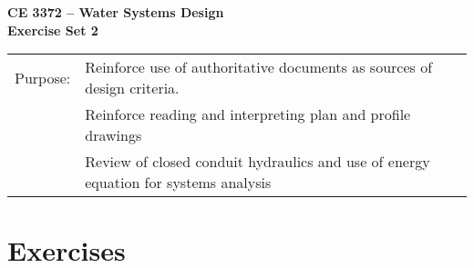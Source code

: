 \documentclass[12pt]{article}
\begin{document}
\begin{center}
{\textbf{{ CE 3372 -- Water Systems Design} \\ {Exercise Set 2}}}
\end{center}
\begingroup
\begin{tabular}{p{1in} p{5in}}
Purpose: & Reinforce use of authoritative documents as sources of design criteria. \\
~             & Reinforce reading and interpreting plan and profile drawings \\
~             & Review of closed conduit hydraulics and use of energy equation for systems analysis \\
\end{tabular}
\endgroup
\section*{\small{Exercises}}
\end{document}
